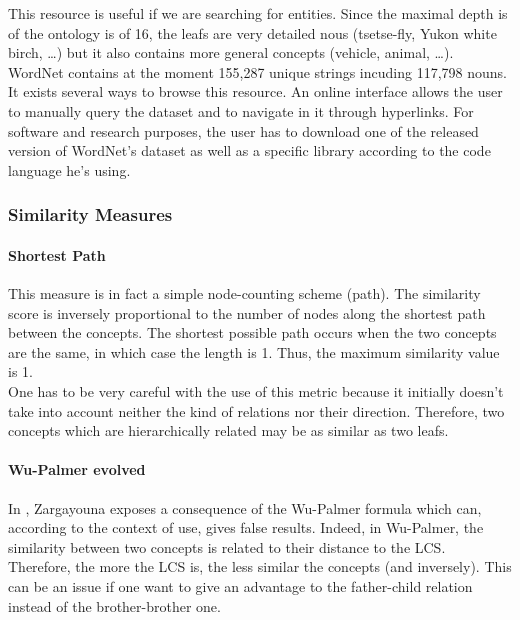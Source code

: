 This resource is useful if we are searching for entities. Since the maximal depth is of the ontology is of 16, the leafs are very detailed nous (tsetse-fly, Yukon white birch, \dots) but it also contains more general concepts (vehicle, animal, \dots). WordNet contains at the moment 155,287 unique strings incuding 117,798 nouns.\\ 

It exists several ways to browse this resource. An online interface allows the user to manually query the dataset and to navigate in it through hyperlinks. For software and research purposes, the user has to download one of the released version of WordNet's dataset as well as a specific library according to the code language he's using.\\

\subsubsection{Similarity Measures} %
\label{ssub:similarity_measures}
\paragraph{Shortest Path} %
\label{par:shortest_path}
This measure is in fact a simple node-counting scheme (path). The similarity score is inversely proportional to the number of nodes along the shortest path between the concepts. The shortest possible path occurs when the two concepts are the same, in which case the length is 1. Thus, the maximum similarity value is 1.\\
One has to be very careful with the use of this metric because it initially doesn't take into account neither the kind of relations nor their direction. Therefore, two concepts which are hierarchically related may be as similar as two leafs.
\paragraph{Wu-Palmer evolved} %
\label{par:wu_palmer_evolved}
In \cite{zara}, Zargayouna exposes a consequence of the Wu-Palmer formula which can, according to the context of use, gives false results. Indeed, in Wu-Palmer, the similarity between two concepts is related to their distance to the LCS. Therefore, the more  the LCS is, the less similar the concepts (and inversely). This can be an issue if one want to give an advantage to the father-child relation instead of the brother-brother one. \\

